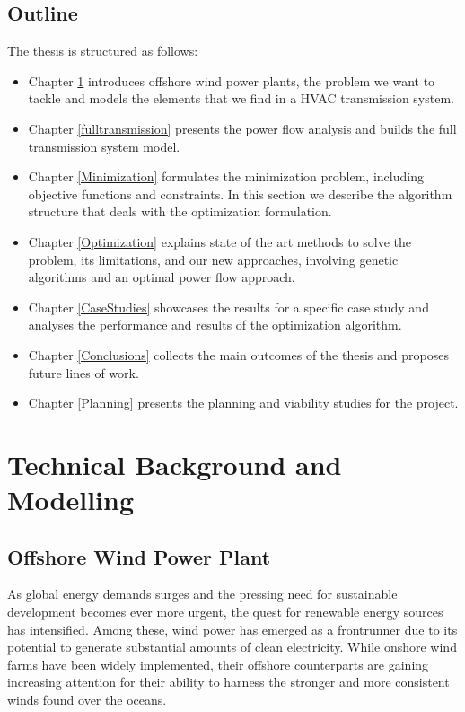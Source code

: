 \documentclass[a4paper,11pt, titlepage, twoside]{article}
\begin{document}
\subsection{Outline}

The thesis is structured as follows:
\begin{itemize}
    \item Chapter \ref{Grid} introduces offshore wind power plants, the problem we want to tackle and models the elements that we find in a HVAC transmission system.
    \item Chapter \ref{fulltransmission} presents the power flow analysis and builds the full transmission system model. 
    \item Chapter \ref{Minimization}  formulates the minimization problem, including objective functions and constraints. In this section we describe
    the algorithm structure that deals with the optimization formulation.
    \item Chapter \ref{Optimization} explains state of the art methods to solve the problem, its limitations, and our new approaches, involving
    genetic algorithms and  an optimal power flow approach.
    \item Chapter \ref{CaseStudies} showcases  the results for a specific case study and analyses the performance and results of the optimization algorithm.
    \item Chapter \ref{Conclusions} collects the main outcomes of the thesis and proposes future lines of work.
    \item Chapter \ref{Planning} presents the planning and viability studies for the project.
\end{itemize}
\section{Technical Background and Modelling}\label{Grid}

\subsection{Offshore Wind Power Plant}
As global energy demands surges and the pressing need for sustainable development becomes ever more urgent, 
the quest for renewable energy sources has intensified. Among these, wind power has emerged as a frontrunner due to its potential to generate substantial amounts of clean electricity.
While onshore wind farms have been widely implemented, their offshore counterparts are gaining increasing attention for their ability to harness the stronger and more consistent winds found over the oceans.\par
\end{document}
